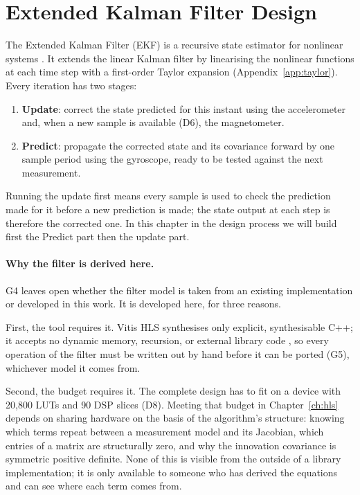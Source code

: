 \documentclass[12pt,a4paper]{article}
\begin{document}
\section{Extended Kalman Filter Design}
\label{ch:ekf-design}

The Extended Kalman Filter (EKF) is a recursive state estimator for
nonlinear systems \citep{grewal2015kalman}. It extends the linear
Kalman filter by linearising the nonlinear functions at each time
step with a first-order Taylor expansion
(Appendix~\ref{app:taylor}). Every iteration has two stages:

\begin{enumerate}
  \item \textbf{Update}: correct the state predicted for this
        instant using the accelerometer and, when a new sample is
        available (D6), the magnetometer.
  \item \textbf{Predict}: propagate the corrected state and its
        covariance forward by one sample period using the gyroscope,
        ready to be tested against the next measurement.
\end{enumerate}
Running the update first means every sample is used to check the
prediction made for it before a new prediction is made; the state
output at each step is therefore the corrected one. In this chapter in the design process we will build first the Predict part then the update part.

\paragraph{Why the filter is derived here.} G4 leaves open whether
the filter model is taken from an existing implementation or
developed in this work. It is developed here, for three reasons.

First, the tool requires it. Vitis HLS synthesises only explicit,
synthesisable C++; it accepts no dynamic memory, recursion, or
external library code \citep{amd_ug1399}, so every operation of the
filter must be written out by hand before it can be ported (G5),
whichever model it comes from.

Second, the budget requires it. The complete design has to fit on a
device with 20,800 LUTs and 90 DSP slices (D8). Meeting that budget
in Chapter~\ref{ch:hls} depends on sharing hardware on the basis of
the algorithm's structure: knowing which terms repeat between a
measurement model and its Jacobian, which entries of a matrix are
structurally zero, and why the innovation covariance is symmetric
positive definite. None of this is visible from the outside of a
library implementation; it is only available to someone who has
derived the equations and can see where each term comes from.
\end{document}
